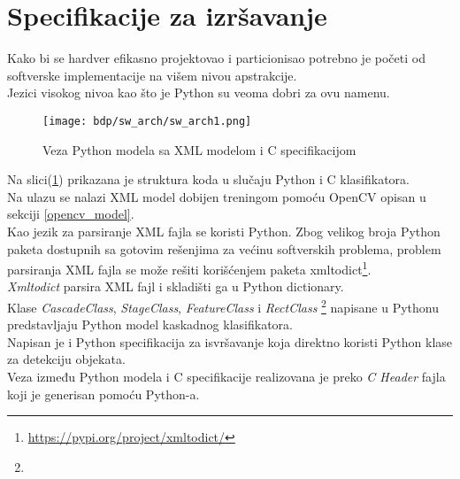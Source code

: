 \section{Specifikacije za izršavanje}

Kako bi se hardver efikasno projektovao i particionisao potrebno je početi od
softverske implementacije na višem nivou apstrakcije.  \\
Jezici visokog nivoa kao što je Python su veoma dobri za ovu namenu.

\begin{figure}[h]
  \centering
  \texttt{[image: bdp/sw\_arch/sw\_arch1.png]}
  \caption{Veza Python modela sa XML modelom i C specifikacijom}
  \label{sw_arch_spec1}
\end{figure}

Na slici(\ref{sw_arch_spec1}) prikazana je struktura koda u slučaju Python i C
klasifikatora. \\

\noindent
Na ulazu se nalazi XML model dobijen treningom pomoću OpenCV opisan u sekciji
\ref{opencv_model}. \\
Kao jezik za parsiranje XML fajla se koristi Python.
Zbog velikog broja Python paketa dostupnih sa gotovim rešenjima za većinu softverskih problema, problem
parsiranja XML fajla se može rešiti korišćenjem paketa xmltodict\footnote{\url{https://pypi.org/project/xmltodict/}}. \\
\emph{Xmltodict} parsira XML fajl i skladišti ga u Python dictionary. \\
Klase \emph{CascadeClass}, \emph{StageClass}, \emph{FeatureClass} i
\emph{RectClass}  \footnote{\texttt{}} napisane u Pythonu
predstavljaju Python model kaskadnog klasifikatora. \\

Napisan je i Python specifikacija za isvršavanje koja direktno koristi Python
klase za detekciju objekata. \\
Veza između Python modela i C specifikacije realizovana je preko \emph{C Header}
fajla koji je generisan pomoću Python-a.